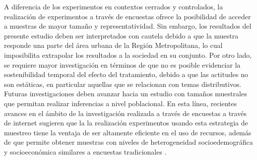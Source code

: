 \documentclass[12pt]{article}
\begin{document}
A diferencia de los experimentos en contextos cerrados y controlados, la realización de experimentos a través de encuestas ofrece la posibilidad de acceder a muestras de mayor tamaño y representatividad. Sin embargo, los resultados del presente estudio deben ser interpretados con cautela debido a que la muestra responde una parte del área urbana de la Región Metropolitana, lo cual imposibilita extrapolar los resultados a la sociedad en su conjunto. Por otro lado, se requiere mayor investigación en términos de que no es posible evidenciar la sostenibilidad temporal del efecto del tratamiento, debido a que las actitudes no son estáticas, en particular aquellas que se relacionan con temas distributivos. Futuras investigaciones deben avanzar hacia un estudio con tamaños muestrales que permitan realizar inferencias a nivel poblacional. En esta línea, recientes avances en el ámbito de la investigación realizada a través de encuestas a través de internet sugieren que la la realización experimentos usando esta estrategia de muestreo tiene la ventaja de ser altamente eficiente en el uso de recursos, además de que permite obtener muestras con niveles de heterogeneidad socioedemográfica y socioeconómica similares a encuestas tradicionales \citep{Zhang2018}.   
  
 


\end{document}
